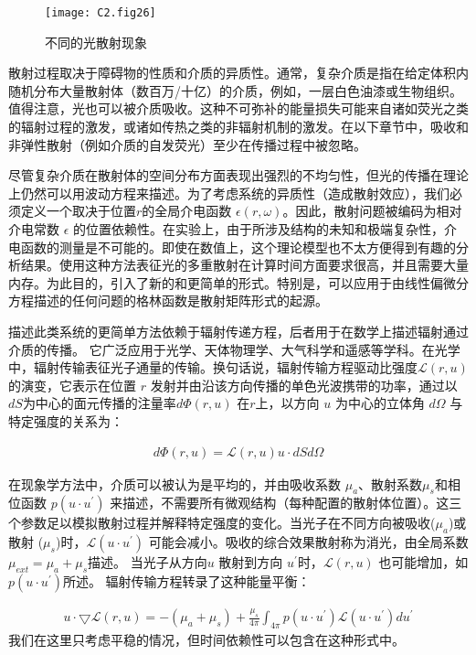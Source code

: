 \begin{figure}[htp]
	\centering
	\texttt{[image: C2.fig26]}
	\caption{不同的光散射现象}
	\label{fig2:26}
\end{figure}

散射过程取决于障碍物的性质和介质的异质性。通常，复杂介质是指在给定体积内随机分布大量散射体（数百万/十亿）的介质，例如，一层白色油漆或生物组织。值得注意，光也可以被介质吸收。这种不可弥补的能量损失可能来自诸如荧光之类的辐射过程的激发，或诸如传热之类的非辐射机制的激发。在以下章节中，吸收和非弹性散射（例如介质的自发荧光）至少在传播过程中被忽略。

尽管复杂介质在散射体的空间分布方面表现出强烈的不均匀性，但光的传播在理论上仍然可以用波动方程来描述。为了考虑系统的异质性（造成散射效应），我们必须定义一个取决于位置$r$的全局介电函数 $ \epsilon (r,\omega)$。因此，散射问题被编码为相对介电常数 $ \epsilon$ 的位置依赖性。在实验上，由于所涉及结构的未知和极端复杂性，介电函数的测量是不可能的。即使在数值上，这个理论模型也不太方便得到有趣的分析结果。使用这种方法表征光的多重散射在计算时间方面要求很高，并且需要大量内存。为此目的，引入了新的和更简单的形式。特别是，可以应用于由线性偏微分方程描述的任何问题的格林函数是散射矩阵形式的起源。

描述此类系统的更简单方法依赖于辐射传递方程，后者用于在数学上描述辐射通过介质的传播。 它广泛应用于光学、天体物理学、大气科学和遥感等学科。在光学中，辐射传输表征光子通量的传输。换句话说，辐射传输方程驱动比强度$\mathcal{L}(r, u)$ 的演变，它表示在位置 $r$ 发射并由沿该方向传播的单色光波携带的功率，通过以$dS$为中心的面元传播的注量率$d \Phi(r, u)$ 在$r$上，以方向 $u$ 为中心的立体角 $d\Omega$ 与特定强度的关系为：

\begin{equation}
\begin{aligned}
    d \Phi(r, u) = \mathcal{L}(r, u)u \cdot dS d\Omega
\end{aligned}
\label{eq:2.01}
\end{equation}

在现象学方法中，介质可以被认为是平均的，并由吸收系数 $\mu_{a}$、散射系数$\mu_{s}$和相位函数 $p(u·u^{\prime})$ 来描述，不需要所有微观结构（每种配置的散射体位置）。这三个参数足以模拟散射过程并解释特定强度的变化。当光子在不同方向被吸收($\mu_{a}$)或散射 ($\mu_{s}$)时，$\mathcal{L}(u·u^{\prime})$ 可能会减小。吸收的综合效果散射称为消光，由全局系数 $\mu_{ext} = \mu_{a} + \mu_{s}$描述。 当光子从方向$u$ 散射到方向 $u^{\prime}$时，$\mathcal{L}(r, u)$ 也可能增加，如 $p(u·u^{\prime})$所述。
辐射传输方程转录了这种能量平衡：

\begin{equation}
\begin{aligned}
    u \cdot \bigtriangledown  \mathcal{L}(r, u) = -(\mu_{a} + \mu_{s})+\frac{\mu_{s}}{4\pi}\int_{4\pi} p(u·u^{\prime}) \mathcal{L}(u·u^{\prime}) d u^{\prime}
\end{aligned}
\label{eq:2.02}
\end{equation}
我们在这里只考虑平稳的情况，但时间依赖性可以包含在这种形式中。

